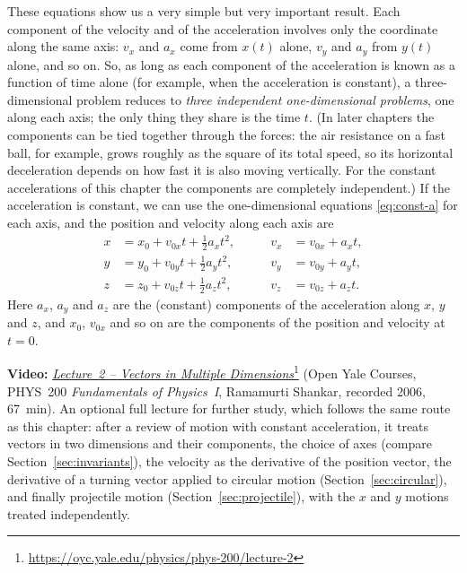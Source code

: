 \documentclass[11pt,a4paper]{article}
\begin{document}
These equations show us a very simple but very important result. Each component of the velocity
and of the acceleration involves only the coordinate along the same axis: $v_x$ and $a_x$ come from
$x(t)$ alone, $v_y$ and $a_y$ from $y(t)$ alone, and so on. So, as long as each component of the
acceleration is known as a function of time alone (for example, when the acceleration is
constant), a three-dimensional problem reduces to \emph{three independent one-dimensional
problems}, one along each axis; the only thing they share is the time $t$. (In later chapters the
components can be tied together through the forces: the air resistance on a fast ball, for
example, grows roughly as the square of its total speed, so its horizontal deceleration depends on
how fast it is also moving vertically. For the constant accelerations of this chapter the
components are completely independent.) If the acceleration is constant, we can use the
one-dimensional equations \eqref{eq:const-a} for each axis, and the position and velocity along each
axis are
\begin{equation}\label{eq:const-a3}
\begin{aligned}
  x &= x_0 + v_{0x}t + \tfrac12 a_x t^2 , &\qquad v_x &= v_{0x} + a_x t , \\
  y &= y_0 + v_{0y}t + \tfrac12 a_y t^2 , &\qquad v_y &= v_{0y} + a_y t , \\
  z &= z_0 + v_{0z}t + \tfrac12 a_z t^2 , &\qquad v_z &= v_{0z} + a_z t .
\end{aligned}
\end{equation}
Here $a_x$, $a_y$ and $a_z$ are the (constant) components of the acceleration along $x$, $y$ and
$z$, and $x_0$, $v_{0x}$ and so on are the components of the position and velocity at $t = 0$.

\begin{aside}
\textbf{Video:}
\href{https://oyc.yale.edu/physics/phys-200/lecture-2}{\emph{Lecture~2 -- Vectors in Multiple
Dimensions}}\footnote{\url{https://oyc.yale.edu/physics/phys-200/lecture-2}} (Open Yale Courses,
PHYS~200 \emph{Fundamentals of Physics~I}, Ramamurti Shankar, recorded 2006, 67~min). An optional
full lecture for further study, which follows the same route as this chapter: after a review of
motion with constant acceleration, it treats vectors in two dimensions and their components, the
choice of axes (compare Section~\ref{sec:invariants}), the velocity as the derivative of the
position vector, the derivative of a turning vector applied to circular motion
(Section~\ref{sec:circular}), and finally projectile motion (Section~\ref{sec:projectile}), with
the $x$ and $y$ motions treated independently.
\end{aside}
\end{document}
